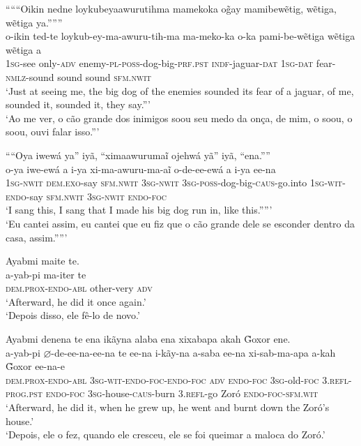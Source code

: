 \documentclass[output=paper,
modfonts,nonflat
]{langsci/langscibook}
\begin{document}
  
\ea “““Oikin nedne loykubeyaawurutihma mamekoka o\~{g}ay mamibewẽtig, wẽtiga, wẽtiga ya.”””\\[.3em]
\gll o-ikin ted-te loykub{\footnotemark}-ey-ma-awuru-tih-ma ma-meko-ka o-ka pami-be-wẽtiga wẽtiga wẽtiga a\\
\textsc{1sg}-see only-\textsc{adv} enemy-\textsc{pl-poss}-dog-big-\textsc{prf.pst} \textsc{indf}-jaguar-\textsc{dat} \textsc{1sg-dat} fear-\textsc{nmlz}-sound sound sound \textsc{sfm.nwit}\\
\glt ‘Just at seeing me, the big dog of the enemies sounded its fear of a jaguar, of me, sounded it, sounded it, they say.”’\\
\glt ‘Ao me ver, o cão grande dos inimigos soou seu medo da onça, de mim, o soou, o soou, ouvi falar isso.”’\\
\z

\ea ““Oya iwewá ya” iyã, “ximaawurumaĩ ojehwá yã” iyã, “ena.””\\[.3em]
\gll o-ya iwe-ewá a i-ya xi-ma-awuru-ma-aĩ o-de-ee-ewá a i-ya ee-na\\
\textsc{1sg-nwit} \textsc{dem.exo}-say \textsc{sfm.nwit} \textsc{3sg-nwit} \textsc{3sg-poss}-dog-big-\textsc{caus}-go.into \textsc{1sg-wit}-\textsc{endo}-say \textsc{sfm.nwit} \textsc{3sg-nwit} \textsc{endo-foc}\\
\glt ‘I sang this, I sang that I made his big dog run in, like this.””’\\
\glt ‘Eu cantei assim, eu cantei que eu fiz que o cão grande dele se esconder dentro da casa, assim.””’\\
\z

\ea Ayabmi maite te.\\[.3em]
\gll a-yab-pi ma-iter te\\
\textsc{dem.prox-endo-abl} other-very \textsc{adv}\\
\glt ‘Afterward, he did it once again.’\\
\glt ‘Depois disso, ele fê-lo de novo.’\\
\z

 
\ea Ayabmi denena te ena ikãyna alaba ena xixabapa akah \~{G}oxor ene.\\[.3em]
\gll a-yab-pi \(\varnothing\)-de-ee-na-ee-na te ee-na i-kãy-na a-saba ee-na xi-sab-ma-apa a-kah \~{G}oxor ee-na-e\\
\textsc{dem.prox-endo-abl} \textsc{3sg-wit-endo-foc-endo-foc} \textsc{adv} \textsc{endo-foc} \textsc{3sg}-old-\textsc{foc} \textsc{3.refl-prog.pst} \textsc{endo-foc} \textsc{3sg}-house-\textsc{caus}-burn \textsc{3.refl}-go Zoró \textsc{endo-foc-sfm.wit}\\
\glt ‘Afterward, he did it, when he grew up, he went and burnt down the Zoró’s house.’\\
\glt ‘Depois, ele o fez, quando ele cresceu, ele se foi queimar a maloca do Zoró.’\\
\z
\end{document}

